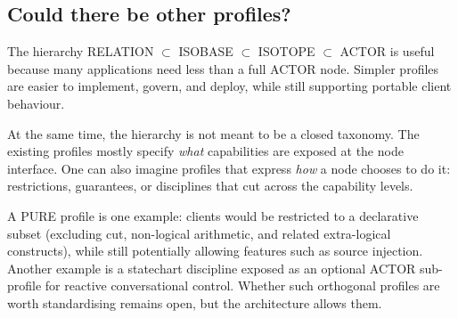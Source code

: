 \subsection{Could there be other profiles?}\label{sec:other-profiles}

The hierarchy RELATION $\subset$ ISOBASE $\subset$ ISOTOPE $\subset$ ACTOR is useful because many applications need less than a full ACTOR node. Simpler profiles are easier to implement, govern, and deploy, while still supporting portable client behaviour.

At the same time, the hierarchy is not meant to be a closed taxonomy. The existing profiles mostly specify \emph{what} capabilities are exposed at the node interface. One can also imagine profiles that express \emph{how} a node chooses to do it: restrictions, guarantees, or disciplines that cut across the capability levels.

A \textsc{PURE} profile is one example: clients would be restricted to a declarative subset (excluding cut, non-logical arithmetic, and related extra-logical constructs), while still potentially allowing features such as source injection. Another example is a statechart discipline exposed as an optional ACTOR sub-profile for reactive conversational control. Whether such orthogonal profiles are worth standardising remains open, but the architecture allows them.

